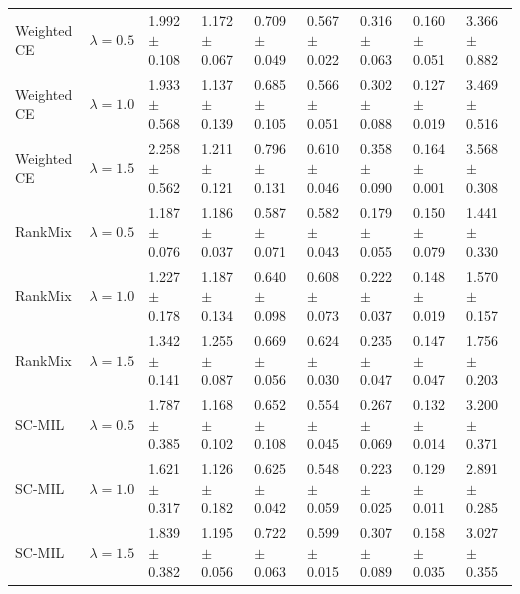 \begin{tabular}{lllllllll}
Weighted CE & $\lambda=0.5$ & \num{1.992} $\pm$ \num{0.108} & \num{1.172} $\pm$ \num{0.067} & \num{0.709} $\pm$ \num{0.049} & \num{0.567} $\pm$ \num{0.022} & \num{0.316} $\pm$ \num{0.063} & \num{0.160} $\pm$ \num{0.051} & \num{3.366} $\pm$ \num{0.882}\\
Weighted CE & $\lambda=1.0$ & \num{1.933} $\pm$ \num{0.568} & \num{1.137} $\pm$ \num{0.139} & \num{0.685} $\pm$ \num{0.105} & \num{0.566} $\pm$ \num{0.051} & \num{0.302} $\pm$ \num{0.088} & \num{0.127} $\pm$ \num{0.019} & \num{3.469} $\pm$ \num{0.516}\\
Weighted CE & $\lambda=1.5$ & \num{2.258} $\pm$ \num{0.562} & \num{1.211} $\pm$ \num{0.121} & \num{0.796} $\pm$ \num{0.131} & \num{0.610} $\pm$ \num{0.046} & \num{0.358} $\pm$ \num{0.090} & \num{0.164} $\pm$ \num{0.001} & \num{3.568} $\pm$ \num{0.308}\\
RankMix & $\lambda=0.5$ & \num{1.187} $\pm$ \num{0.076} & \num{1.186} $\pm$ \num{0.037} & \num{0.587} $\pm$ \num{0.071} & \num{0.582} $\pm$ \num{0.043} & \num{0.179} $\pm$ \num{0.055} & \num{0.150} $\pm$ \num{0.079} & \num{1.441} $\pm$ \num{0.330}\\
RankMix & $\lambda=1.0$ & \num{1.227} $\pm$ \num{0.178} & \num{1.187} $\pm$ \num{0.134} & \num{0.640} $\pm$ \num{0.098} & \num{0.608} $\pm$ \num{0.073} & \num{0.222} $\pm$ \num{0.037} & \num{0.148} $\pm$ \num{0.019} & \num{1.570} $\pm$ \num{0.157}\\
RankMix & $\lambda=1.5$ & \num{1.342} $\pm$ \num{0.141} & \num{1.255} $\pm$ \num{0.087} & \num{0.669} $\pm$ \num{0.056} & \num{0.624} $\pm$ \num{0.030} & \num{0.235} $\pm$ \num{0.047} & \num{0.147} $\pm$ \num{0.047} & \num{1.756} $\pm$ \num{0.203}\\
SC-MIL & $\lambda=0.5$ & \num{1.787} $\pm$ \num{0.385} & \num{1.168} $\pm$ \num{0.102} & \num{0.652} $\pm$ \num{0.108} & \num{0.554} $\pm$ \num{0.045} & \num{0.267} $\pm$ \num{0.069} & \num{0.132} $\pm$ \num{0.014} & \num{3.200} $\pm$ \num{0.371}\\
SC-MIL & $\lambda=1.0$ & \num{1.621} $\pm$ \num{0.317} & \num{1.126} $\pm$ \num{0.182} & \num{0.625} $\pm$ \num{0.042} & \num{0.548} $\pm$ \num{0.059} & \num{0.223} $\pm$ \num{0.025} & \num{0.129} $\pm$ \num{0.011} & \num{2.891} $\pm$ \num{0.285}\\
SC-MIL & $\lambda=1.5$ & \num{1.839} $\pm$ \num{0.382} & \num{1.195} $\pm$ \num{0.056} & \num{0.722} $\pm$ \num{0.063} & \num{0.599} $\pm$ \num{0.015} & \num{0.307} $\pm$ \num{0.089} & \num{0.158} $\pm$ \num{0.035} & \num{3.027} $\pm$ \num{0.355}\\
\bottomrule
\end{tabular}
